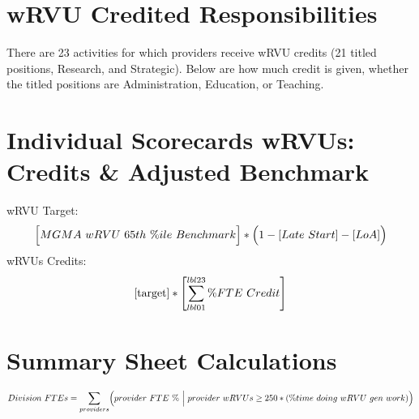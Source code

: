 \documentclass{article}
\begin{document}

	\section{wRVU Credited Responsibilities} %
		There are 23 activities for which providers receive wRVU credits (21 titled positions, Research, and Strategic).  Below are how much credit is given, whether the titled positions are Administration, Education, or Teaching. 
		

	\section{Individual Scorecards wRVUs: Credits \& Adjusted Benchmark} %
		wRVU Target:
		\begin{equation}\label{target}
			\Bigl[ MGMA \ wRVU \ 65th \ \%ile \ Benchmark \Bigr]* \Bigl( 1 - [Late \ Start] - [LoA]\Bigr) 
		\end{equation}
		wRVUs Credits:
		\begin{equation*}
			\eqref{target} * \Biggl[ \sum_{lbl01}^{lbl23} \%FTE \ Credit \Biggr] 
		\end{equation*}
	
	\section{Summary Sheet Calculations}
		\begin{equation*}
			Division \ FTEs = \sum_{providers} \Bigl(provider \ FTE \ \% \ \Big| \ provider \ wRVUs \ge 250*(\% time \ doing \ wRVU \ gen \ work) \Bigr)
		\end{equation*} 
\end{document}
